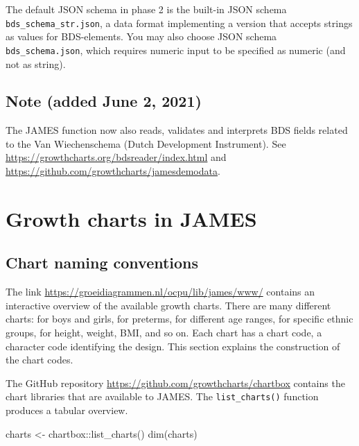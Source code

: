 \documentclass[
]{book}
\newenvironment{Shaded}{\begin{snugshade}}{\end{snugshade}}
\newcommand{\FunctionTok}[1]{\textcolor[rgb]{0.00,0.00,0.00}{#1}}
\newcommand{\NormalTok}[1]{#1}
\newcommand{\OtherTok}[1]{\textcolor[rgb]{0.56,0.35,0.01}{#1}}
\newcommand{\SpecialCharTok}[1]{\textcolor[rgb]{0.00,0.00,0.00}{#1}}
\begin{document}
The default JSON schema in phase 2 is the built-in JSON schema \texttt{bds\_schema\_str.json}, a data format implementing a version that accepts strings as values for BDS-elements. You may also choose JSON schema \texttt{bds\_schema.json}, which requires numeric input to be specified as numeric (and not as string).

\hypertarget{note-added-june-2-2021}{%
\section{Note (added June 2, 2021)}\label{note-added-june-2-2021}}

The JAMES function now also reads, validates and interprets BDS fields related to the Van Wiechenschema (Dutch Development Instrument). See \url{https://growthcharts.org/bdsreader/index.html} and \url{https://github.com/growthcharts/jamesdemodata}.

\hypertarget{growth-charts-in-james}{%
\chapter{Growth charts in JAMES}\label{growth-charts-in-james}}

\hypertarget{chart-naming-conventions}{%
\section{Chart naming conventions}\label{chart-naming-conventions}}

The link \url{https://groeidiagrammen.nl/ocpu/lib/james/www/} contains an interactive overview of the available growth charts. There are many different charts: for boys and girls, for preterms, for different age ranges, for specific ethnic groups, for height, weight, BMI, and so on. Each chart has a chart code, a character code identifying the design. This section explains the construction of the chart codes.

The GitHub repository \url{https://github.com/growthcharts/chartbox} contains the chart libraries that are available to JAMES. The \texttt{list\_charts()} function produces a tabular overview.

\begin{Shaded}
\begin{Highlighting}[]
\NormalTok{charts }\OtherTok{\textless{}{-}}\NormalTok{ chartbox}\SpecialCharTok{::}\FunctionTok{list\_charts}\NormalTok{()}
\FunctionTok{dim}\NormalTok{(charts)}
\end{Highlighting}
\end{Shaded}
\end{document}
